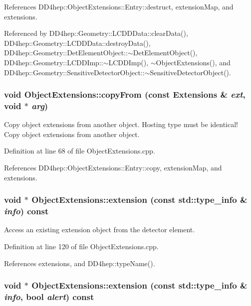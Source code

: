 References DD4hep::ObjectExtensions::Entry::destruct, extensionMap, and extensions.

Referenced by DD4hep::Geometry::LCDDData::clearData(), DD4hep::Geometry::LCDDData::destroyData(), DD4hep::Geometry::DetElementObject::$\sim$DetElementObject(), DD4hep::Geometry::LCDDImp::$\sim$LCDDImp(), $\sim$ObjectExtensions(), and DD4hep::Geometry::SensitiveDetectorObject::$\sim$SensitiveDetectorObject().\hypertarget{class_d_d4hep_1_1_object_extensions_a45c52f32737b70516b0ee96ddd3e14be}{
\subsubsection[{copyFrom}]{\setlength{\rightskip}{0pt plus 5cm}void ObjectExtensions::copyFrom (const {\bf Extensions} \& {\em ext}, \/  void $\ast$ {\em arg})}}
\label{class_d_d4hep_1_1_object_extensions_a45c52f32737b70516b0ee96ddd3e14be}


Copy object extensions from another object. Hosting type must be identical! Copy object extensions from another object. 

Definition at line 68 of file ObjectExtensions.cpp.

References DD4hep::ObjectExtensions::Entry::copy, extensionMap, and extensions.\hypertarget{class_d_d4hep_1_1_object_extensions_ae12b64d5f695d41e521d2d55711d4dfc}{
\subsubsection[{extension}]{\setlength{\rightskip}{0pt plus 5cm}void $\ast$ ObjectExtensions::extension (const std::type\_\-info \& {\em info}) const}}
\label{class_d_d4hep_1_1_object_extensions_ae12b64d5f695d41e521d2d55711d4dfc}


Access an existing extension object from the detector element. 

Definition at line 120 of file ObjectExtensions.cpp.

References extensions, and DD4hep::typeName().\hypertarget{class_d_d4hep_1_1_object_extensions_ae1ea9d894574f33c63ea3d44427f4c0c}{
\subsubsection[{extension}]{\setlength{\rightskip}{0pt plus 5cm}void $\ast$ ObjectExtensions::extension (const std::type\_\-info \& {\em info}, \/  bool {\em alert}) const}}
\label{class_d_d4hep_1_1_object_extensions_ae1ea9d894574f33c63ea3d44427f4c0c}


